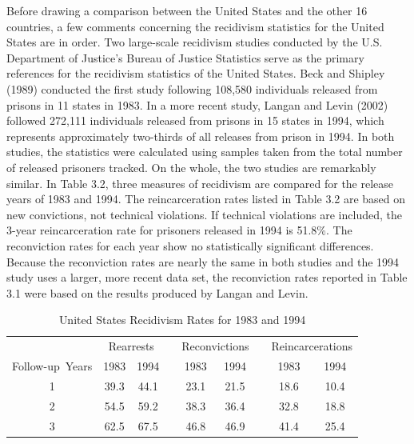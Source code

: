 Before drawing a comparison between the United States and the other 16 countries, a few comments concerning the recidivism statistics for the United States are in order.  Two large-scale recidivism studies conducted by the U.S. Department of Justice's Bureau of Justice Statistics serve as the primary references for the recidivism statistics of the United States.  Beck and Shipley (1989) conducted the first study following 108,580 individuals released from prisons in 11 states in 1983.  In a more recent study, Langan and Levin (2002) followed 272,111 individuals released from prisons in 15 states in 1994, which represents approximately two-thirds of all releases from prison in 1994.  In both studies, the statistics were calculated using samples taken from the total number of released prisoners tracked.  On the whole, the two studies are remarkably similar.  In Table 3.2, three measures of recidivism are compared for the release years of 1983 and 1994.  The reincarceration rates listed in Table 3.2 are based on new convictions, not technical violations.  If technical violations are included, the 3-year reincarceration rate for prisoners released in 1994 is 51.8\%.  The reconviction rates for each year show no statistically significant differences. Because the reconviction rates are nearly the same in both studies and the 1994 study uses a larger, more recent data set, the reconviction rates reported in Table 3.1 were based on the results produced by Langan and Levin.



\begin{table}[b]
\begin{center}
\caption{United States Recidivism Rates for 1983 and 1994}
\vspace{0.1cm}
\begin{tabular}{ccccccccc}
  \hline
   & \multicolumn{2}{c}{Rearrests} & & \multicolumn{2}{c}{Reconvictions} & & \multicolumn{2}{c}{Reincarcerations} \\ \cline{2-3} \cline{5-6} \cline{8-9}
  \mbox{Follow-up Years} & 1983 & 1994 & & \hspace{0.08cm} 1983 & 1994 & & \hspace{0.18cm} 1983 & 1994 \\ \hline
  1 & 39.3 & 44.1 & & \hspace{0.08cm} 23.1 & 21.5 & & \hspace{0.18cm} 18.6 & 10.4 \\
  2 & 54.5 & 59.2 & & \hspace{0.08cm} 38.3 & 36.4 & & \hspace{0.18cm} 32.8 & 18.8 \\
  3 & 62.5 & 67.5 & & \hspace{0.08cm} 46.8 & 46.9 & & \hspace{0.18cm} 41.4 & 25.4 \\
  \hline
\end{tabular}
\end{center}
\end{table}



